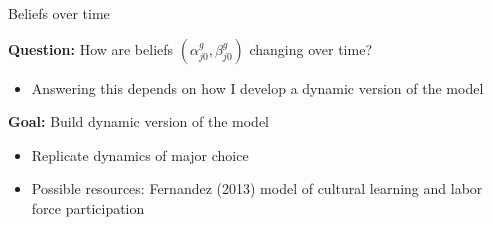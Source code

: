 \documentclass[compress, 8pt]{beamer}
\begin{document}




\begin{frame}{Beliefs over time}



\textbf{Question:} How are beliefs $(\alpha_{j0}^g, \beta_{j0}^g)$ changing over time? 
\begin{itemize}
    \item Answering this depends on how I develop a dynamic version of the model
\end{itemize}

\vspace{3ex}
\textbf{Goal:} Build dynamic version of the model
\begin{itemize}
    \item Replicate dynamics of major choice \ \hyperlink{intro_male_fields}{}
    \item Possible resources: Fernandez (2013) model of cultural learning and labor force participation
\end{itemize}

\end{frame}
\end{document}
